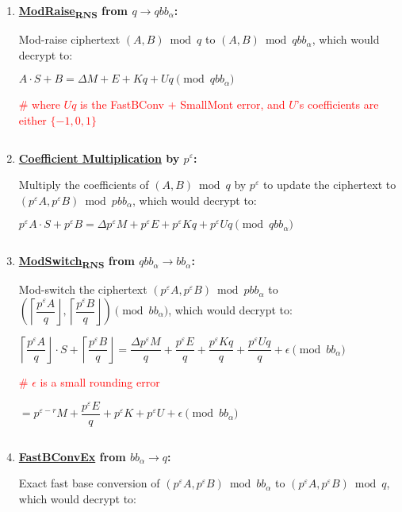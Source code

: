 \begin{enumerate}

\item \textbf{\underline{\textsf{ModRaise\textsubscript{RNS}}} from $q \rightarrow qbb_\alpha$: } 

Mod-raise ciphertext $(A, B) \bmod q$ to $(A, B) \bmod qbb_\alpha$, which would decrypt to:  

$A\cdot S + B = \Delta M + E + Kq + Uq \pmod{ qbb_\alpha}$ 

\textcolor{red}{ \# where $Uq$ is the \textsf{FastBConv} + \textsf{SmallMont} error, and $U$'s coefficients are either $\{-1, 0, 1\}$}

$ $

\item \textbf{\underline{Coefficient Multiplication} by $p^\varepsilon$: } 

Multiply the coefficients of $(A, B) \bmod q$ by $p^\varepsilon$ to update the ciphertext to  $(p^\varepsilon A,p^\varepsilon B) \bmod{ pbb_\alpha}$, which would decrypt to: 

$p^\varepsilon A\cdot S + p^\varepsilon B = \Delta p^\varepsilon M + p^\varepsilon E + p^\varepsilon Kq + p^\varepsilon Uq \pmod{qbb_\alpha}$

$ $

\item \textbf{\underline{\textsf{ModSwitch\textsubscript{RNS}}} from $qbb_\alpha \rightarrow bb_\alpha$: } 

Mod-switch the ciphertext $(p^\varepsilon A,p^\varepsilon B) \bmod pbb_\alpha$ to $\left(\left\lceil\dfrac{p^\varepsilon A}{q}\right\rfloor,\left\lceil\dfrac{p^\varepsilon B}{q}\right\rfloor\right) \pmod{bb_\alpha}$, which would decrypt to: 

$\left\lceil\dfrac{p^\varepsilon A}{q}\right\rfloor\cdot S + \left\lceil\dfrac{p^\varepsilon B}{q}\right\rfloor = \dfrac{\Delta p^\varepsilon M}{q} + \dfrac{p^\varepsilon E}{q} + \dfrac{p^\varepsilon Kq}{q} + \dfrac{p^\varepsilon Uq}{q} + \epsilon  \pmod {bb_\alpha}$ 

\textcolor{red}{ \# $\epsilon$ is a small rounding error}

$ = p^{\varepsilon - r}M + \dfrac{p^\varepsilon E}{q} + p^\varepsilon K + p^\varepsilon U +\epsilon \pmod{ bb_\alpha}$ 

$ $

\item \textbf{\underline{\textsf{FastBConvEx}} from $bb_\alpha \rightarrow q$: } 

Exact fast base conversion of $(p^\varepsilon A, p^\varepsilon B) \bmod bb_\alpha$ to $(p^\varepsilon A, p^\varepsilon B) \bmod q$, which would decrypt to:


\end{enumerate}

